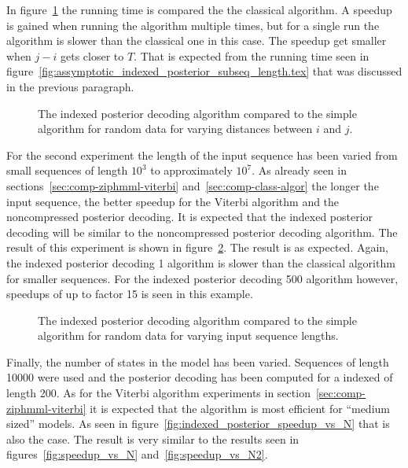 In figure~\ref{fig:indexed_posterior_speedup_vs_subseq} the running time is
compared the the classical algorithm. A speedup is gained when running the
algorithm multiple times, but for a single run the algorithm is slower than the
classical one in this case. The speedup get smaller when $j - i$ gets closer to
$T$. That is expected from the running time seen in
figure~\ref{fig:assymptotic_indexed_posterior_subseq_length.tex} that was
discussed in the previous paragraph.

\begin{figure}
  \centering
  
  \caption{The indexed posterior decoding algorithm compared to the simple
    algorithm for random data for varying distances between $i$ and $j$.}
  \label{fig:indexed_posterior_speedup_vs_subseq}
\end{figure}

For the second experiment the length of the input sequence has been varied from
small sequences of length $10^3$ to approximately $10^7$. As already seen in
sections~\ref{sec:comp-ziphmml-viterbi} and~\ref{sec:comp-class-algor} the
longer the input sequence, the better speedup for the Viterbi algorithm and the
noncompressed posterior decoding. It is expected that the indexed posterior
decoding will be similar to the noncompressed posterior decoding algorithm. The
result of this experiment is shown in
figure~\ref{fig:indexed_posterior_speedup_vs_T}. The result is as
expected. Again, the indexed posterior decoding 1 algorithm is slower than
the classical algorithm for smaller sequences. For the indexed posterior
decoding 500 algorithm however, speedups of up to factor 15 is seen in this
example.

\begin{figure}
  \centering
  
  \caption{The indexed posterior decoding algorithm compared to the simple
    algorithm for random data for varying input sequence lengths.}
  \label{fig:indexed_posterior_speedup_vs_T}
\end{figure}

Finally, the number of states in the model has been varied. Sequences of length
10000 were used and the posterior decoding has been computed for a indexed of
length 200. As for the Viterbi algorithm experiments in
section~\ref{sec:comp-ziphmml-viterbi} it is expected that the algorithm is
most efficient for ``medium sized'' models. As seen in
figure~\ref{fig:indexed_posterior_speedup_vs_N} that is also the case. The
result is very similar to the results seen in figures~\ref{fig:speedup_vs_N}
and~\ref{fig:speedup_vs_N2}.

